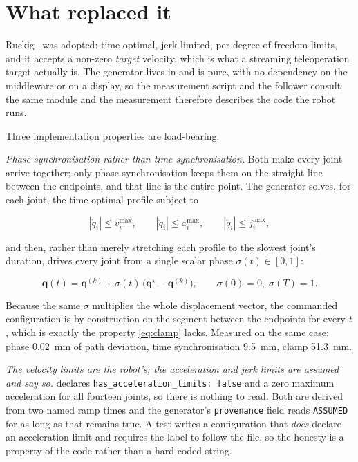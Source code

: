 \section{What replaced it}

Ruckig~\cite{berscheid2021ruckig} was adopted: time-optimal, jerk-limited,
per-degree-of-freedom limits, and it accepts a non-zero \emph{target}
velocity, which is what a streaming teleoperation target actually is. The
generator lives in  and is pure, with
no dependency on the middleware or on a display, so the measurement script and
the follower consult the same module and the measurement therefore describes
the code the robot runs.

Three implementation properties are load-bearing.

\emph{Phase synchronisation rather than time synchronisation.} Both make every
joint arrive together; only phase synchronisation keeps them on the straight
line between the endpoints, and that line is the entire point. The generator
solves, for each joint, the time-optimal profile subject to

\begin{equation}
  \label{eq:ruckig-limits}
  |\dot{q}_i| \le v_i^{\max}, \qquad
  |\ddot{q}_i| \le a_i^{\max}, \qquad
  |\dddot{q}_i| \le j_i^{\max},
\end{equation}

and then, rather than merely stretching each profile to the slowest joint's
duration, drives every joint from a single scalar phase
$\sigma(t) \in [0,1]$:

\begin{equation}
  \label{eq:phase-sync}
  \mathbf{q}(t) = \mathbf{q}^{(k)}
    + \sigma(t)\,\bigl(\mathbf{q}^{\star} - \mathbf{q}^{(k)}\bigr),
  \qquad \sigma(0) = 0,\; \sigma(T) = 1 .
\end{equation}

Because the same $\sigma$ multiplies the whole displacement vector, the
commanded configuration is by construction on the segment between the
endpoints for every $t$, which is exactly the property \cref{eq:clamp}
lacks. Measured on the same case: phase \SI{0.02}{\milli\metre} of path
deviation, time synchronisation \SI{9.5}{\milli\metre}, clamp
\SI{51.3}{\milli\metre}.

\emph{The velocity limits are the robot's; the acceleration and jerk limits
are assumed and say so.}  declares
\texttt{has\_acceleration\_limits: false} and a zero maximum acceleration for
all fourteen joints, so there is nothing to read. Both are derived from two
named ramp times and the generator's \texttt{provenance} field reads
\texttt{ASSUMED} for as long as that remains true. A test writes a
configuration that \emph{does} declare an acceleration limit and requires the
label to follow the file, so the honesty is a property of the code rather than
a hard-coded string.

